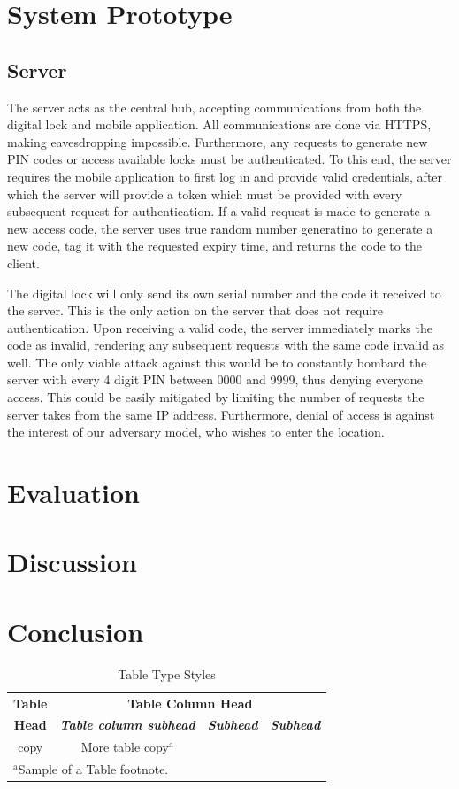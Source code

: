 \documentclass[conference]{IEEEtran}
\begin{document}
\section{System Prototype}
\subsection{Server}
The server acts as the central hub, accepting communications from both the digital lock and mobile application. All communications are done via HTTPS, making eavesdropping impossible. Furthermore, any requests to generate new PIN codes or access available locks must be authenticated. To this end, the server requires the mobile application to first log in and provide valid credentials, after which the server will provide a token which must be provided with every subsequent request for authentication. If a valid request is made to generate a new access code, the server uses true random number generatino to generate a new code, tag it with the requested expiry time, and returns the code to the client.

The digital lock will only send its own serial number and the code it received to the server. This is the only action on the server that does not require authentication. Upon receiving a valid code, the server immediately marks the code as invalid, rendering any subsequent requests with the same code invalid as well. The only viable attack against this would be to constantly bombard the server with every 4 digit PIN between 0000 and 9999, thus denying everyone access. This could be easily mitigated by limiting the number of requests the server takes from the same IP address. Furthermore, denial of access is against the interest of our adversary model, who wishes to enter the location.


\section{Evaluation}

\section{Discussion}

\section{Conclusion}

\begin{table}[htbp]
\caption{Table Type Styles}
\begin{center}
\begin{tabular}{|c|c|c|c|}
\hline
\textbf{Table}&\multicolumn{3}{|c|}{\textbf{Table Column Head}} \\
\cline{2-4} 
\textbf{Head} & \textbf{\textit{Table column subhead}}& \textbf{\textit{Subhead}}& \textbf{\textit{Subhead}} \\
\hline
copy& More table copy$^{\mathrm{a}}$& &  \\
\hline
\multicolumn{4}{l}{$^{\mathrm{a}}$Sample of a Table footnote.}
\end{tabular}
\label{tab1}
\end{center}
\end{table}
\end{document}
